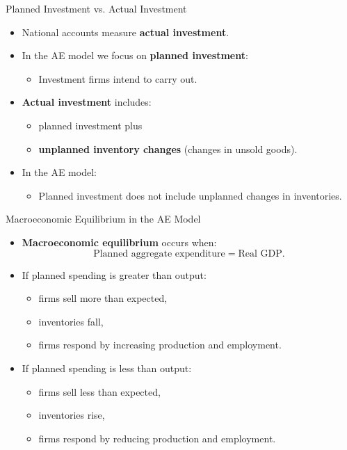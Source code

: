\documentclass[aspectratio=169]{beamer}
\begin{document}
\begin{frame}{Planned Investment vs. Actual Investment}
\transfade
\begin{itemize}
  \item National accounts measure \textbf{actual investment}.
  \item In the AE model we focus on \textbf{planned investment}:
  \begin{itemize}
    \item Investment firms intend to carry out.
  \end{itemize}
  \item \textbf{Actual investment} includes:
  \begin{itemize}
    \item planned investment plus
    \item \textbf{unplanned inventory changes} (changes in unsold goods).
  \end{itemize}
  \item In the AE model:
  \begin{itemize}
    \item Planned investment does not include unplanned changes in inventories.
  \end{itemize}
\end{itemize}
\end{frame}

\begin{frame}{Macroeconomic Equilibrium in the AE Model}
\transfade
\begin{itemize}
  \item \textbf{Macroeconomic equilibrium} occurs when:
  \[
    \text{Planned aggregate expenditure} = \text{Real GDP}.
  \]
  \item If planned spending is greater than output:
  \begin{itemize}
    \item firms sell more than expected,
    \item inventories fall,
    \item firms respond by increasing production and employment.
  \end{itemize}
  \item If planned spending is less than output:
  \begin{itemize}
    \item firms sell less than expected,
    \item inventories rise,
    \item firms respond by reducing production and employment.
  \end{itemize}
\end{itemize}
\end{frame}
\end{document}
